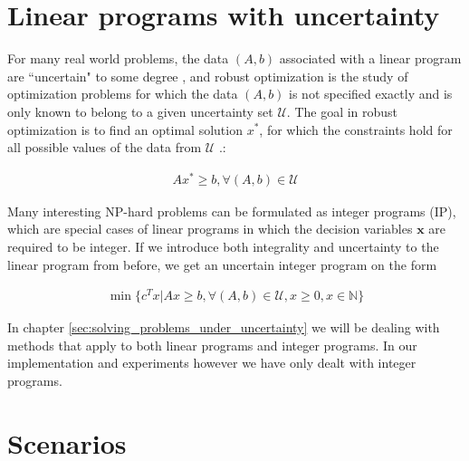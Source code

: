 \section{Linear programs with uncertainty}
\label{sec:linear_programs_with_uncertainty}

For many real world problems, the data $(A,b)$ associated with a
linear program are ``uncertain" to some degree \cite{bental}, and
robust optimization is the study of optimization problems for which
the data $(A,b)$ is not specified exactly and is only known to belong
to a given uncertainty set $\mathcal{U}$. The goal in robust
optimization is to find an optimal solution $x^*$, for which the
constraints hold for all possible values of the data from
$\mathcal{U}$ \cite{bental}.: 

\begin{eqnarray}
\label{eqn:robustsolutions}
Ax^* \geq b, \forall (A,b) \in \mathcal{U}
\end{eqnarray}

Many interesting NP-hard problems can be formulated as integer
programs (IP), which are special cases of linear programs in which the
decision variables $\mathbf{x}$ are required to be integer. If we
introduce both integrality and uncertainty to the linear program from
before, we get an uncertain integer program on the
form

\begin{eqnarray}
\label{eqn:uncertain_ip}
\min \lbrace c^T x \vert A x \geq b, \forall(A,b) \in \mathcal{U},
x\geq 0, x \in \mathbb{N} \rbrace
\end{eqnarray}

In chapter \ref{sec:solving_problems_under_uncertainty} we will be
dealing with methods that apply to both linear programs and integer
programs. In our implementation and experiments however we have only dealt with
integer programs.

%
\section{Scenarios}
\label{sec:scenarios}


